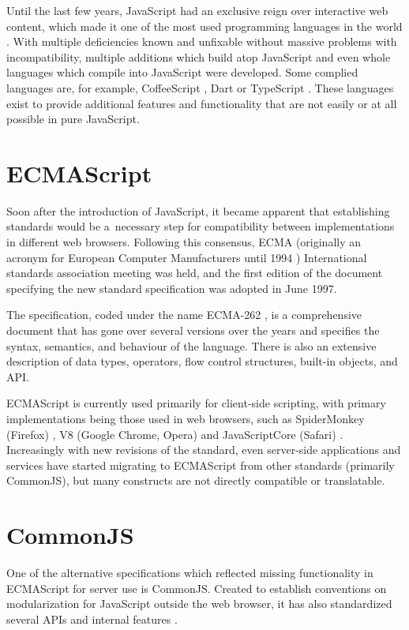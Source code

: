 Until the last few years, JavaScript had an exclusive reign over interactive web
content, which made it one of the most used programming languages in the world
\cite{stack-overflow-survey}. With multiple deficiencies known and unfixable
without massive problems with incompatibility, multiple additions which build
atop JavaScript and even whole languages which compile into JavaScript were
developed. Some complied languages are, for example, CoffeeScript
\cite{coffeescript-homepage}, Dart \cite{dart-homepage} or TypeScript
\cite{typescript-homepage}. These languages exist to provide additional features
and functionality that are not easily or at all possible in pure JavaScript.

\section*{ECMAScript}
Soon after the introduction of JavaScript, it became apparent that establishing
standards would be a~necessary step for compatibility between implementations in
different web browsers. Following this consensus, ECMA (originally an acronym
for European Computer Manufacturers until 1994 \cite{ecma-mission})
International standards association meeting was held, and the first edition of
the document specifying the new standard specification was adopted in June 1997.

The specification, coded under the name ECMA-262 \cite{ecma-262}, is a
comprehensive document that has gone over several versions over the years and
specifies the syntax, semantics, and behaviour of the language. There is also an
extensive description of data types, operators, flow control structures,
built-in objects, and API.

ECMAScript is currently used primarily for client-side scripting, with primary
implementations being those used in web browsers, such as SpiderMonkey (Firefox)
\cite{spidermonkey-documentation}, V8 (Google Chrome, Opera) \cite{v8-homepage}
and JavaScriptCore (Safari) \cite{javascript-core}. Increasingly with new
revisions of the standard, even server-side applications and services have
started migrating to ECMAScript from other standards (primarily CommonJS), but
many constructs are not directly compatible or translatable.

\section*{CommonJS}
One of the alternative specifications which reflected missing functionality in
ECMAScript for server use is CommonJS. Created to establish conventions on
modularization for JavaScript outside the web browser, it has also standardized
several APIs and internal features \cite{commonjs-spec}. 

